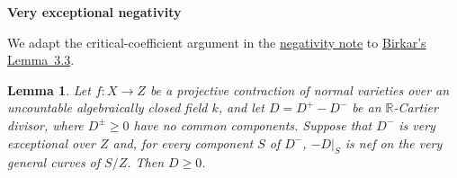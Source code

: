 \documentclass[11pt,a4paper]{article}
\newtheorem*{lemma}{Lemma}
\begin{document}
\begin{center}\large\bfseries Very exceptional negativity\end{center}
We adapt the critical-coefficient argument in the
\href{https://username1380068.github.io/Note/notes/negativity.html}{negativity note}
to \href{https://www.numdam.org/article/PMIHES_2012__115__325_0.pdf}{Birkar's Lemma~3.3}.

\begin{lemma}
Let $f:X\to Z$ be a projective contraction of normal varieties over an
uncountable algebraically closed field $k$,
and let $D=D^+-D^-$ be an $\mathbb R$-Cartier divisor, where $D^\pm\ge0$
have no common components. Suppose that $D^-$ is very exceptional over $Z$
and, for every component $S$ of $D^-$, $-D|_S$ is nef on the very general
curves of $S/Z$. Then $D\ge0$.
\end{lemma}
\end{document}
